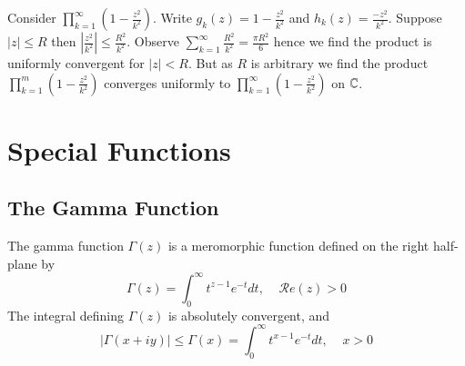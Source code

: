 \documentclass[12pt, a4paper, oneside, openright, titlepage]{book}
\begin{document}
\begin{eg}
    Consider $\prod_{k=1}^{\infty}\left(1-\frac{z^2}{k^2}\right)$. Write $g_k(z) = 1-\frac{z^2}{k^2}$ and $h_k(z) = \frac{-z^2}{k^2}$. Suppose $|z| \leq R$ then $\left|\frac{z^2}{k^2}\right| \leq \frac{R^2}{k^2}$. Observe $\sum_{k=1}^{\infty}\frac{R^2}{k^2} = \frac{\pi R^2}{6}$ hence we find the product is uniformly convergent for $|z| < R$. But as $R$ is arbitrary we find the product $\prod_{k=1}^{m}\left(1-\frac{z^2}{k^2}\right)$ converges uniformly to $\prod_{k=1}^{\infty}\left(1-\frac{z^2}{k^2}\right)$ on $\mathbb C$.
\end{eg}







\chapter{Special Functions}


\section{The Gamma Function}

\begin{defn}
    The gamma function $\Gamma(z)$ is a meromorphic function defined on the right half-plane by \begin{equation*}
        \Gamma(z) = \int_0^{\infty}t^{z-1}e^{-t}dt,\;\;\;\;\mathscr{R}e(z) > 0
    \end{equation*}
    The integral defining $\Gamma(z)$ is absolutely convergent, and \begin{equation*}
        |\Gamma(x+iy)| \leq \Gamma(x) = \int_0^{\infty}t^{x-1}e^{-t}dt,\;\;\;\;x>0
    \end{equation*}
\end{defn}
\end{document}
